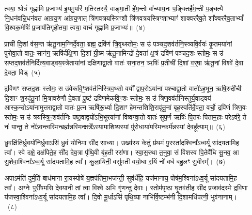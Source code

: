 त्वया॒ श्रोत्रं॑ गृह्णामि प्र॒जाभ्य॑ इ॒यमु॒परि॑ म॒तिस्तस्यै॒ वाङ्मा॒ती हे॑म॒न्तो वा᳚च्याय॒नः प॒ङ्क्तिर्\mbox{}है॑म॒न्ती प॒ङ्क्त्यै नि॒धन॑वन्नि॒धन॑वत आग्रय॒ण आ᳚ग्रय॒णात् त्रि॑णवत्रयस्त्रिꣳ॒शौ त्रि॑णवत्रयस्त्रिꣳ॒शाभ्याꣳ॑ शाक्वररैव॒ते शा᳚क्वररैव॒ता\-भ्यां᳚ वि॒श्वक॒र्मर्\mbox{}षिः॑ प्र॒जा\-प॑तिगृहीतया॒ त्वया॒ वाचं॑ गृह्णामि प्र॒जाभ्यः॑॥~(४)

{\anuvakamend[{त्वया॒ मनो॑ ज॒मद॑ग्नि॒र्॒\mbox{}ऋषिः॑ प्र॒जा\-प॑तिगृहीतया त्रि॒ꣳ॒शच्च॑}]}%

प्राची॑ दि॒शां व॑स॒न्त ऋ॑तू॒नाम॒ग्निर्दे॒वता॒ ब्रह्म॒ द्रवि॑णं त्रि॒वृथ्स्तोमः॒ स उ॑ पञ्चद॒शव॑र्तनि॒स्त्र्यवि॒र्वयः॑ कृ॒तमया॑नां पुरोवा॒तो वातः॒ सान॑ग॒ ऋषि॑र्दक्षि॒णा दि॒शां ग्री॒ष्म ऋ॑तू॒नामिन्द्रो॑ दे॒वता᳚ क्ष॒त्रं द्रवि॑णं पञ्चद॒शः स्तोमः॒ स उ॑ सप्तद॒शव॑र्तनिर्दित्य॒वाड्वय॒स्त्रेताया॑नां दक्षिणाद्वा॒तो वातः॑ सना॒तन॒ ऋषिः॑ प्र॒तीची॑ दि॒शां व॒र्॒\mbox{}षा ऋ॑तू॒नां विश्वे॑ दे॒वा दे॒वता॒ विड्~(५)

द्रवि॑णꣳ सप्तद॒शः स्तोमः॒ स उ॑वेकवि॒ꣳ॒शव॑र्तनिस्त्रिव॒थ्सो वयो᳚ द्वाप॒रो\-ऽया॑नां पश्चाद्वा॒तो वातो॑\-ऽह॒भून॒ ऋषि॒रुदी॑ची दि॒शाꣳ श॒रदृ॑तू॒नां मि॒त्रावरु॑णौ दे॒वता॑ पु॒ष्टं द्रवि॑णमेकवि॒ꣳ॒शः स्तोमः॒ स उ॑ त्रिण॒वव॑र्तनिस्तुर्य॒वाड्वय॑ आस्क॒न्दो\-ऽया॑नामुत्तराद्वा॒तो वातः॑ प्र॒त्न ऋषि॑रू॒र्ध्वा दि॒शाꣳ हे॑मन्तशिशि॒रावृ॑तू॒नां बृह॒स्पति॑र्दे॒वता॒ वर्चो॒ द्रवि॑णं त्रिण॒वः स्तोमः॒ स उ॑ त्रयस्त्रि॒ꣳ॒शव॑र्तनिः पष्ठ॒वाद्वयो॑\-ऽभि॒भूरया॑नां विष्वग्वा॒तो वातः॑ सुप॒र्ण ऋषिः॑ पि॒तरः॑ पिताम॒हाः परे\-ऽव॑रे॒ ते नः॑ पान्तु॒ ते नो॑\-ऽवन्त्व॒स्मिन्ब्रह्म॑न्न॒स्मिन्क्ष॒त्रे᳚\-ऽस्यामा॒शिष्य॒स्यां पु॑रो॒धाया॑म॒स्मिन्कर्म॑न्न॒स्यां दे॒वहू᳚त्याम्॥~(६)

{\anuvakamend[{विट्प॑ष्ठ॒वाड्वयो॒\-ऽष्टाविꣳ॑शतिश्च}]}%

ध्रु॒वक्षि॑तिर्ध्रु॒वयो॑निर्ध्रु॒वाऽसि॑ ध्रु॒वं योनि॒मा सी॑द सा॒ध्या। उख्य॑स्य के॒तुं प्र॑थ॒मं पु॒रस्ता॑द॒श्विना᳚\-ऽ\-ध्व॒र्यू सा॑दयतामि॒ह त्वा᳚। स्वे दक्षे॒ दक्ष॑पिते॒ह सी॑द देव॒त्रा पृ॑थि॒वी बृ॑ह॒ती ररा॑णा। स्वा॒स॒स्था त॒नुवा॒ सं वि॑शस्व पि॒तेवै॑धि सू॒नव॒ आ सु॒शेवा॒श्विना᳚\-ऽ\-ध्व॒र्यू सा॑दयतामि॒ह त्वा᳚। कु॒ला॒यिनी॒ वसु॑मती वयो॒धा र॒यिं नो॑ वर्ध बहु॒लꣳ सु॒वीरम्᳚।~(७)

अपाऽम॑तिं दुर्म॒तिं बाध॑माना रा॒यस्पोषे॑ य॒ज्ञप॑तिमा॒भज॑न्ती॒ सुव॑र्धेहि॒ यज॑मानाय॒ पोष॑म॒श्विना᳚\-ऽ\-ध्व॒र्यू सा॑दयतामि॒ह त्वा᳚। अ॒ग्नेः पुरी॑षमसि देव॒यानी॒ तां त्वा॒ विश्वे॑ अ॒भि गृ॑णन्तु दे॒वाः। स्तोम॑पृष्ठा घृ॒तव॑ती॒ह सी॑द प्र॒जाव॑द॒स्मे द्रवि॒णा य॑जस्वा॒श्विना᳚\-ऽ\-ध्व॒र्यू सा॑दयतामि॒ह त्वा᳚। दि॒वो मू॒र्धाऽसि॑ पृथि॒व्या नाभि॑र्वि॒ष्टम्भ॑नी दि॒शामधि॑पत्नी॒ भुव॑नानाम्।~(८)

